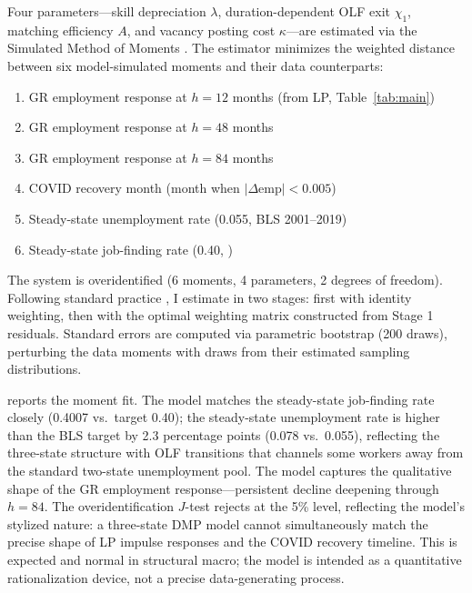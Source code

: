 \documentclass[12pt]{article}
\begin{document}
Four parameters---skill depreciation $\lambda$, duration-dependent OLF exit $\chi_1$, matching efficiency $A$, and vacancy posting cost $\kappa$---are estimated via the Simulated Method of Moments \citep[SMM;][]{mcfadden1989method,pakes1989simulation}. The estimator minimizes the weighted distance between six model-simulated moments and their data counterparts:

\begin{enumerate}
\item GR employment response at $h = 12$ months (from LP, Table~\ref{tab:main})
\item GR employment response at $h = 48$ months
\item GR employment response at $h = 84$ months
\item COVID recovery month (month when $|\Delta \text{emp}| < 0.005$)
\item Steady-state unemployment rate (0.055, BLS 2001--2019)
\item Steady-state job-finding rate (0.40, \citealt{shimer2005cyclical})
\end{enumerate}

The system is overidentified (6 moments, 4 parameters, 2 degrees of freedom). Following standard practice \citep{hansen1982large,duffie1993simulated}, I estimate in two stages: first with identity weighting, then with the optimal weighting matrix constructed from Stage 1 residuals. Standard errors are computed via parametric bootstrap (200 draws), perturbing the data moments with draws from their estimated sampling distributions.



 reports the moment fit. The model matches the steady-state job-finding rate closely (0.4007 vs.\ target 0.40); the steady-state unemployment rate is higher than the BLS target by 2.3 percentage points (0.078 vs.\ 0.055), reflecting the three-state structure with OLF transitions that channels some workers away from the standard two-state unemployment pool. The model captures the qualitative shape of the GR employment response---persistent decline deepening through $h = 84$. The overidentification $J$-test rejects at the 5\% level, reflecting the model's stylized nature: a three-state DMP model cannot simultaneously match the precise shape of LP impulse responses and the COVID recovery timeline. This is expected and normal in structural macro; the model is intended as a quantitative rationalization device, not a precise data-generating process.
\end{document}
